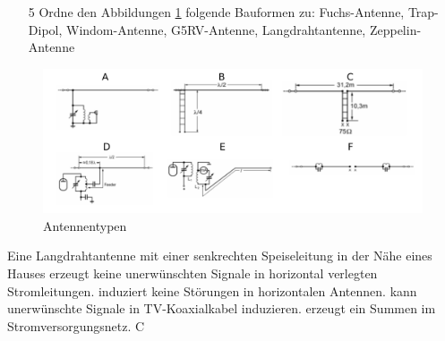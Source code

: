 \begin{enumerate} 
\itemsep1pt\parskip0pt
\item[5] Ordne den Abbildungen \ref{Antennentypen} folgende Bauformen zu: Fuchs-Antenne, Trap-Dipol, Windom-Antenne, G5RV-Antenne, Langdrahtantenne, Zeppelin-Antenne
\end{enumerate}

\begin{figure}[H]
    \centering
    \includegraphics[scale=0.8]{Antennen/Bilder/Antennentypen.png}
    \caption{Antennentypen}
    \label{Antennentypen}
\end{figure}


{Eine Langdrahtantenne mit einer senkrechten Speiseleitung in der Nähe eines Hauses}%
{erzeugt keine unerwünschten Signale in horizontal verlegten Stromleitungen.}%
{induziert keine Störungen in horizontalen Antennen.}%
{kann unerwünschte Signale in TV-Koaxialkabel induzieren.}%
{erzeugt ein Summen im Stromversorgungsnetz.}%
{C}%